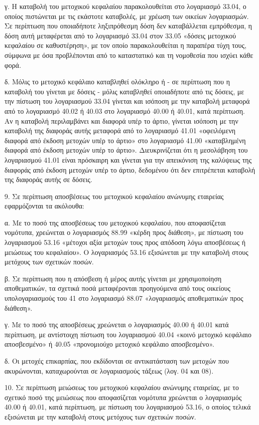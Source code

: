\documentclass[A4,10pt,greek]{book}
\begin{document}
γ. Η καταβολή του μετοχικού κεφαλαίου παρακολουθείται στο λογαριασμό 33.04, ο οποίος πιστώνεται με τις εκάστοτε καταβολές, με χρέωση των οικείων λογαριασμών.  Σε περίπτωση που οποιαδήποτε ληξιπρόθεσμη δόση δεν καταβάλλεται εμπρόθεσμα, η δόση αυτή μεταφέρεται από το λογαριασμό 33.04 στον 33.05 «δόσεις μετοχικού κεφαλαίου σε καθυστέρηση», με τον οποίο παρακολουθείται η παραπέρα τύχη τους, σύμφωνα με όσα προβλέπονται από το καταστατικό και τη νομοθεσία που ισχύει κάθε φορά.

δ. Μόλις το μετοχικό κεφάλαιο καταβληθεί ολόκληρο ή - σε περίπτωση που η καταβολή του γίνεται με δόσεις - μόλις καταβληθεί οποιαδήποτε από τις δόσεις, με την πίστωση του λογαριασμού 33.04 γίνεται και ισόποση με την καταβολή μεταφορά από το λογαριασμό 40.02 ή 40.03 στο λογαριασμό 40.00 ή 40.01, κατά περίπτωση. Αν η καταβολή περιλαμβάνει και διαφορά υπέρ το άρτιο, γίνεται ισόποση με την καταβολή της διαφοράς αυτής μεταφορά από το λογαριασμό 41.01 «οφειλόμενη διαφορά από έκδοση μετοχών υπέρ το άρτιο» στο λογαριασμό 41.00 «καταβλημένη διαφορά από έκδοση μετοχών υπέρ το άρτιο». Διευκρινίζεται ότι η μεσολάβηση του λογαριασμού 41.01 είναι πρόσκαιρη και γίνεται για την απεικόνιση της καλύψεως της διαφοράς από έκδοση μετοχών υπέρ το άρτιο, δεδομένου ότι δεν επιτρέπεται καταβολή της διαφοράς αυτής σε δόσεις.

9. Σε περίπτωση αποσβέσεως του μετοχικού κεφαλαίου ανώνυμης εταιρείας εφαρμόζονται τα ακόλουθα:

α. Με το ποσό της αποσβέσεως του μετοχικού κεφαλαίου, που αποφασίζεται νομότυπα, χρεώνεται ο λογαριασμός 88.99 «κέρδη προς διάθεση», με πίστωση του λογαριασμού 53.16 «μέτοχοι αξία μετοχών τους προς απόδοση λόγω αποσβέσεως ή μειώσεως του κεφαλαίου». Ο λογαριασμός 53.16 εξισώνεται με την καταβολή στους μετόχους των σχετικών ποσών.

β. Σε περίπτωση που η απόσβεση ή μέρος αυτής γίνεται με χρησιμοποίηση αποθεματικών, τα σχετικά ποσά μεταφέρονται προηγούμενα από τους οικείους υπολογαριασμούς του 41 στο λογαριασμό 88.07 «λογαριασμός αποθεματικών προς διάθεση».

γ. Με το ποσό της αποσβέσεως χρεώνεται ο λογαριασμός 40.00 ή 40.01 κατά περίπτωση, με αντίστοιχη πίστωση του λογαριασμού 40.04 «κοινό μετοχικό κεφάλαιο αποσβεσμένο» ή 40.05 «προνομιούχο μετοχικό κεφάλαιο αποσβεσμένο».

δ. Οι μετοχές επικαρπίας, που εκδίδονται σε αντικατάσταση των μετοχών που ακυρώνονται, καταχωρούνται σε λογαριασμούς τάξεως (λογ. 04 και 08).

10. Σε περίπτωση μειώσεως του μετοχικού κεφαλαίου ανώνυμης εταιρείας, με το σχετικό ποσό της μειώσεως που αποφασίζεται νομότυπα χρεώνεται ο λογαριασμός 40.00 ή 40.01, κατά περίπτωση, με πίστωση του λογαριασμού 53.16, ο οποίος τελικά εξισώνεται με την καταβολή στους μετόχους των σχετικών ποσών.
\end{document}
